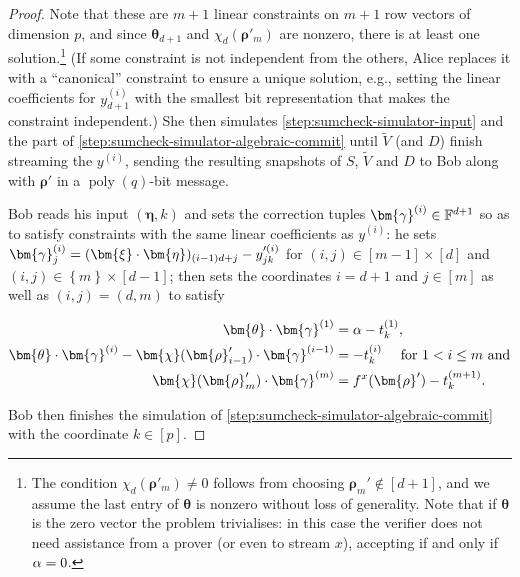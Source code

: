 \documentclass[a4paper,UKenglish,cleveref, autoref, thm-restate]{lipics-v2021}
\theoremstyle{definition}
\newcommand{\field}{\mathbb{F}}
\renewcommand{\set}[1]{\left\{#1\right\}}
\newcommand{\poly}{\operatorname{poly}}
\newcommand{\pcommitlength}{p}
\newcommand{\pcommitstring}{y}
\newcommand{\dimension}{m}
\newcommand{\degree}{d}
\newcommand{\fieldsize}{q}
\newcommand{\fingerprinttuple}{\bm{\rho}}
\def\fe#1{
    \ifnum#1=1
        \alpha
    \else
    \ifnum#1=2
        \beta
    \else
    \ifnum#1=3
        \gamma
    \fi\fi\fi
}
\begin{document}
\begin{proof}
    Note that these are $\dimension + 1$ linear constraints on $\dimension + 1$ row vectors of dimension $\pcommitlength$, and since $\bm{\theta}_{\degree + 1}$ and $\chi_\degree(\fingerprinttuple'_\dimension)$ are nonzero, there is at least one solution.\footnote{The condition $\chi_\degree(\fingerprinttuple'_\dimension) \neq 0$ follows from choosing $\fingerprinttuple_\dimension' \notin [\degree + 1]$, and we assume the last entry of $\bm{\theta}$ is nonzero without loss of generality. Note that if $\bm{\theta}$ is the zero vector the problem trivialises: in this case the verifier does not need assistance from a prover (or even to stream $x$), accepting if and only if $\fe1 = 0$.} (If some constraint is not independent from the others, Alice replaces it with a ``canonical'' constraint to ensure a unique solution, e.g., setting the linear coefficients for $\pcommitstring^{(i)}_{\degree + 1}$ with the smallest bit representation that makes the constraint independent.) She then simulates \cref{step:sumcheck-simulator-input} and the part of \cref{step:sumcheck-simulator-algebraic-commit} until $\widetilde V$ (and $D$) finish streaming the $\pcommitstring^{(i)}$, sending the resulting snapshots of $S$, $\widetilde V$ and $D$ to Bob along with $\fingerprinttuple'$ in a $\poly(\fieldsize)$-bit message.
    
    Bob reads his input $(\bm{\eta}, k)$ and sets the correction tuples $\bm{\fe3}^{(i)} \in \field^{\degree + 1}$ so as to satisfy constraints with the same linear coefficients as $\pcommitstring^{(i)}$: he sets $\bm{\fe3}^{(i)}_j  = (\bm{\xi} \cdot \bm{\eta})_{(i - 1) \degree + j} - \pcommitstring'^{(i)}_{jk}$ for $(i, j) \in [\dimension - 1] \times [\degree]$ and $(i, j) \in \set{\dimension} \times [\degree - 1]$; then sets the coordinates $i = \degree + 1$ and $j \in [\dimension]$ as well as $(i, j) = (\degree, \dimension)$ to satisfy
    
    \begin{align*}
        \bm{\theta} \cdot \bm{\fe3}^{(1)} &= \fe1 - t_k^{(1)},\\
        \bm{\theta} \cdot \bm{\fe3}^{(i)} - \bm{\chi}(\fingerprinttuple_{i-1}') \cdot \bm{\fe3}^{(i-1)} &= -t_k^{(i)} \quad\text{ for } 1 < i \leq \dimension \text { and}\\
        \bm{\chi}(\fingerprinttuple_\dimension') \cdot \bm{\fe3}^{(\dimension)} &= f^x(\fingerprinttuple') - t_k^{(\dimension+1)}.
    \end{align*}
    
    Bob then finishes the simulation of \cref{step:sumcheck-simulator-algebraic-commit} with the coordinate $k \in [\pcommitlength]$.
    

\end{proof}
\end{document}
